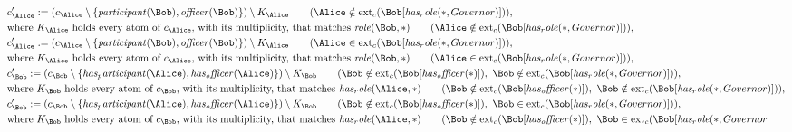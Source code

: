 \begin{align*}
&
c'_
{
\Alice
}
 := 
(c_
{
\Alice
}
 \setminus 
\{
\mathit{
participant
}
(
\Bob
)
,
\mathit{
officer
}
(
\Bob
)
\}
) \setminus K_
{
\Alice
}
 \qquad (
\Alice
 \notin 
\mathrm{ext}_c(
\Bob
[
\mathit{
has_role
}
(
\ast
,
Governor
)
]
)
)
,\\
&
\text{where } K_
{
\Alice
}
 \text{ holds every atom of } c_
{
\Alice
}
 \text{, with its multiplicity, that matches } 
\mathit{
role
}
(
\Bob
,
\ast
)
 \qquad (
\Alice
 \notin 
\mathrm{ext}_c(
\Bob
[
\mathit{
has_role
}
(
\ast
,
Governor
)
]
)
)
,\\
&
c'_
{
\Alice
}
 := 
(c_
{
\Alice
}
 \setminus 
\{
\mathit{
participant
}
(
\Bob
)
,
\mathit{
officer
}
(
\Bob
)
\}
) \setminus K_
{
\Alice
}
 \qquad (
\Alice
 \in 
\mathrm{ext}_c(
\Bob
[
\mathit{
has_role
}
(
\ast
,
Governor
)
]
)
)
,\\
&
\text{where } K_
{
\Alice
}
 \text{ holds every atom of } c_
{
\Alice
}
 \text{, with its multiplicity, that matches } 
\mathit{
role
}
(
\Bob
,
\ast
)
 \qquad (
\Alice
 \in 
\mathrm{ext}_c(
\Bob
[
\mathit{
has_role
}
(
\ast
,
Governor
)
]
)
)
,\\
&
c'_
{
\Bob
}
 := 
(c_
{
\Bob
}
 \setminus 
\{
\mathit{
has_participant
}
(
\Alice
)
,
\mathit{
has_officer
}
(
\Alice
)
\}
) \setminus K_
{
\Bob
}
 \qquad (
\Bob
 \notin 
\mathrm{ext}_c(
\Bob
[
\mathit{
has_officer
}
(
\ast
)
]
)
,\ 
\Bob
 \notin 
\mathrm{ext}_c(
\Bob
[
\mathit{
has_role
}
(
\ast
,
Governor
)
]
)
)
,\\
&
\text{where } K_
{
\Bob
}
 \text{ holds every atom of } c_
{
\Bob
}
 \text{, with its multiplicity, that matches } 
\mathit{
has_role
}
(
\Alice
,
\ast
)
 \qquad (
\Bob
 \notin 
\mathrm{ext}_c(
\Bob
[
\mathit{
has_officer
}
(
\ast
)
]
)
,\ 
\Bob
 \notin 
\mathrm{ext}_c(
\Bob
[
\mathit{
has_role
}
(
\ast
,
Governor
)
]
)
)
,\\
&
c'_
{
\Bob
}
 := 
(c_
{
\Bob
}
 \setminus 
\{
\mathit{
has_participant
}
(
\Alice
)
,
\mathit{
has_officer
}
(
\Alice
)
\}
) \setminus K_
{
\Bob
}
 \qquad (
\Bob
 \notin 
\mathrm{ext}_c(
\Bob
[
\mathit{
has_officer
}
(
\ast
)
]
)
,\ 
\Bob
 \in 
\mathrm{ext}_c(
\Bob
[
\mathit{
has_role
}
(
\ast
,
Governor
)
]
)
)
,\\
&
\text{where } K_
{
\Bob
}
 \text{ holds every atom of } c_
{
\Bob
}
 \text{, with its multiplicity, that matches } 
\mathit{
has_role
}
(
\Alice
,
\ast
)
 \qquad (
\Bob
 \notin 
\mathrm{ext}_c(
\Bob
[
\mathit{
has_officer
}
(
\ast
)
]
)
,\ 
\Bob
 \in 
\mathrm{ext}_c(
\Bob
[
\mathit{
has_role
}
(
\ast
,
Governor

\end{align*}
